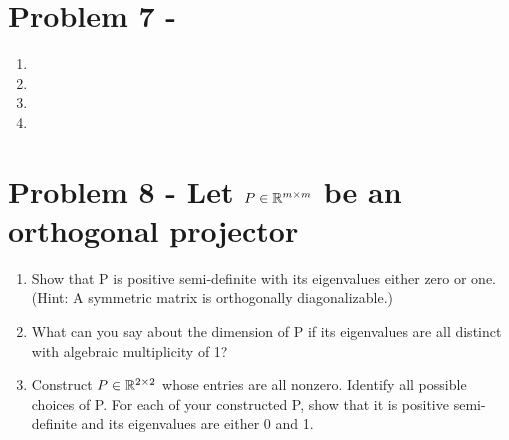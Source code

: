 \documentclass{article}
\begin{document}
\section{Problem 7 - }

\begin{enumerate}
\item

\item

\item 

\item 

\end{enumerate}



\section{Problem 8 - Let $P \in \mathbb{R}^{m\times m}$ be an orthogonal projector}
\begin{enumerate}

\item Show that P is positive semi-definite with its eigenvalues either zero or one. (Hint: A symmetric matrix is orthogonally diagonalizable.)

\item What can you say about the dimension of P if its eigenvalues are all distinct with
algebraic multiplicity of 1?

\item Construct $P \in \mathbb{R}^{2\times2}$ whose entries are all nonzero. Identify all possible choices of P. For each of your constructed P, show that it is positive semi-definite and its eigenvalues are either 0 and 1.

\end{enumerate}
\end{document}
